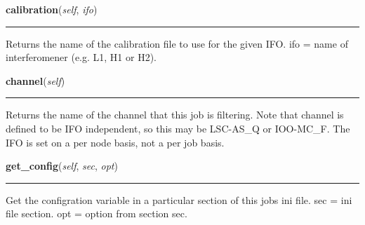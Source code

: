     \label{pipeline:AnalysisJob:calibration}
    \vspace{0.5ex}

    \noindent\begin{boxedminipage}{\textwidth}

    \raggedright \textbf{calibration}(\textit{self}, \textit{ifo})

    \vspace{-1.5ex}

    \rule{\textwidth}{0.5\fboxrule}
    Returns the name of the calibration file to use for the given IFO. 
    ifo = name of interferomener (e.g. L1, H1 or H2).

    \vspace{1ex}

    \end{boxedminipage}

    \label{pipeline:AnalysisJob:channel}
    \vspace{0.5ex}

    \noindent\begin{boxedminipage}{\textwidth}

    \raggedright \textbf{channel}(\textit{self})

    \vspace{-1.5ex}

    \rule{\textwidth}{0.5\fboxrule}
    Returns the name of the channel that this job is filtering. Note that 
    channel is defined to be IFO independent, so this may be LSC-AS\_Q or 
    IOO-MC\_F. The IFO is set on a per node basis, not a per job basis.

    \vspace{1ex}

    \end{boxedminipage}

    \label{pipeline:AnalysisJob:get_config}
    \vspace{0.5ex}

    \noindent\begin{boxedminipage}{\textwidth}

    \raggedright \textbf{get\_config}(\textit{self}, \textit{sec}, \textit{opt})

    \vspace{-1.5ex}

    \rule{\textwidth}{0.5\fboxrule}
    Get the configration variable in a particular section of this jobs 
    ini file. sec = ini file section. opt = option from section sec.

    \vspace{1ex}

    \end{boxedminipage}

